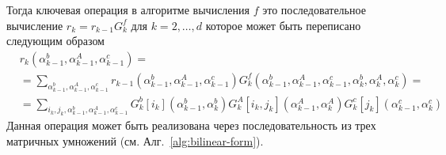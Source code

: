 Тогда ключевая операция в алгоритме вычисления $f$ это последовательное вычисление $r_k = r_{k-1} G_k^f$ для $k=2, \ldots, d$ которое может быть переписано следующим образом 
\begin{equation}
\begin{aligned}
&r_k(\alpha_{k-1}^b,\alpha_{k-1}^A, \alpha_{k-1}^c) = \\
&=\sum_{\alpha_{k-1}^b,\alpha_{k-1}^A, \alpha_{k-1}^c} r_{k-1}(\alpha_{k-1}^b,\alpha_{k-1}^A, \alpha_{k-1}^c) G_k^f(\alpha_{k-1}^b,\alpha_{k-1}^A, \alpha_{k-1}^c,\alpha_{k}^b,\alpha_{k}^A, \alpha_{k}^c) = \\
&=\sum_{i_k, j_k, \alpha_{k-1}^b,\alpha_{k-1}^A, \alpha_{k-1}^c} G_k^b[i_k](\alpha_{k-1}^b, \alpha_{k}^b) G_k^A[i_k, j_k](\alpha_{k-1}^A, \alpha_{k}^A) G_k^c[j_k](\alpha_{k-1}^c, \alpha_{k}^c)
\end{aligned}
\end{equation}
Данная операция может быть реализована через последовательность из трех матричных умножений (см. Алг.~\ref{alg:bilinear-form}).

